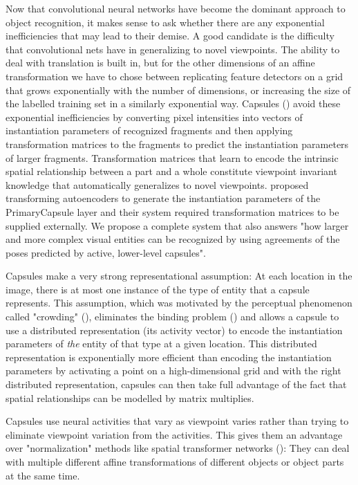 \documentclass{article}
\begin{document}
Now that convolutional neural networks have become the dominant approach to object recognition, it makes sense to ask whether there are any exponential inefficiencies  that may lead to their demise. A good candidate is the difficulty that convolutional nets have in generalizing to novel viewpoints. The ability to deal with translation is built in, but for the other dimensions of an affine transformation we have to chose between replicating feature detectors on a grid that grows exponentially with the number of dimensions, or increasing the size of the labelled training set in a similarly exponential way. Capsules (\cite{hinton2011transforming}) avoid these exponential inefficiencies by converting pixel intensities into vectors of instantiation parameters of recognized fragments and then applying transformation matrices to the fragments to predict the instantiation parameters of larger fragments.  Transformation matrices that learn to encode the intrinsic spatial relationship between a part and a whole constitute viewpoint invariant knowledge that automatically generalizes to novel viewpoints. \citet{hinton2011transforming} proposed transforming autoencoders to generate the instantiation parameters of the PrimaryCapsule layer and their system required transformation matrices to be supplied externally. We propose a complete system that also answers "how larger and more complex visual
entities can be recognized by using agreements of the poses predicted by active,
lower-level capsules".

Capsules make a very strong  representational assumption: At each location in the image, there is at most one instance of the type of entity that a capsule represents.
This assumption, which was motivated by the perceptual phenomenon called "crowding" (\cite{crowding}), eliminates the binding problem (\cite{binding}) and allows a capsule to use a distributed representation (its activity vector) to encode the instantiation parameters of {\it the} entity of that type at a given location. This distributed representation is exponentially more efficient than encoding the instantiation parameters by activating a point on a high-dimensional grid and with the right distributed representation, capsules can then take full advantage of the fact that spatial relationships can be modelled by matrix multiplies. 

Capsules use neural activities that vary as viewpoint varies rather than trying to eliminate viewpoint variation from the activities. This gives them an advantage over "normalization" methods like spatial transformer networks (\cite{spatialtransformer}): They can deal with multiple different affine transformations of different objects or object parts at the same time. 
\end{document}
